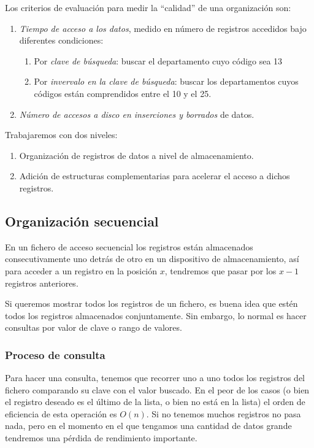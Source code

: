 \documentclass[10pt,a4paper,spanish]{report}
\begin{document}
Los criterios de evaluación para medir la ``calidad'' de una organización son:

\begin{enumerate}[$\heartsuit$]
    \item \textit{\textcolor[rgb]{1,0.2,0.3}{Tiempo de acceso a los datos}}, medido en número de registros accedidos bajo diferentes condiciones:
    \begin{enumerate}[$\longrightarrow$]
        \item Por \textcolor[rgb]{1,0.2,0.3}{\textit{clave de búsqueda}}: buscar el departamento cuyo código sea 13
        \item Por \textcolor[rgb]{1,0.2,0.3}{\textit{invervalo en la clave de búsqueda}}: buscar los departamentos cuyos códigos están comprendidos entre el 10 y el 25.
    \end{enumerate}
    \item \textcolor[rgb]{1,0.2,0.3}{\textit{Número de accesos a disco en inserciones y borrados}} de datos.
\end{enumerate}

Trabajaremos con dos niveles:
\begin{enumerate}[$\heartsuit$]
    \item Organización de registros de datos a nivel de almacenamiento.
    \item Adición de estructuras complementarias para acelerar el acceso a dichos registros.
\end{enumerate}

\textcolor[rgb]{1,0.2,0.3}{\subsection{Organización secuencial}}
En un fichero de acceso secuencial los registros están almacenados consecutivamente uno detrás de otro en un dispositivo de almacenamiento, así para acceder a un registro en la posición $x$, tendremos que pasar por los $x-1$ registros anteriores.

Si queremos mostrar todos los registros de un fichero, es buena idea que estén todos los registros almacenados conjuntamente. Sin embargo, lo normal es hacer consultas por valor de clave o rango de valores.

\textcolor[rgb]{1,0.2,0.3}{\subsubsection{Proceso de consulta}}
Para hacer una consulta, tenemos que recorrer uno a uno todos los registros del fichero comparando su clave con el valor buscado. En el peor de los casos (o bien el registro deseado es el último de la lista, o bien no está en la lista) el orden de eficiencia de esta operación es $O(n)$. Si no tenemos muchos registros no pasa nada, pero en el momento en el que tengamos una cantidad de datos grande tendremos una pérdida de rendimiento importante.
\end{document}

